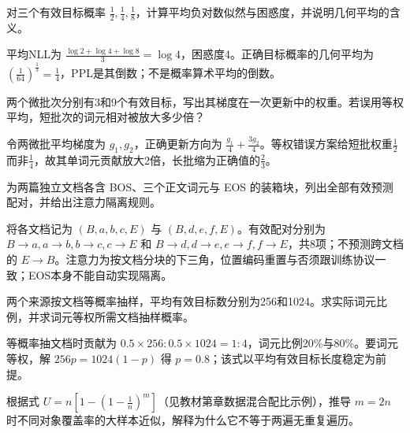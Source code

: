 
\begin{exercises}
\begin{exercise} 对三个有效目标概率 $\frac{1}{2},\frac{1}{4},\frac{1}{8}$，计算平均负对数似然与困惑度，并说明几何平均的含义。

\begin{solution}
平均NLL为 $\frac{\log2+\log4+\log8}{3}=\log4$，困惑度4。正确目标概率的几何平均为 $(\frac{1}{64})^{\frac{1}{3}}=\frac{1}{4}$，PPL是其倒数；不是概率算术平均的倒数。
\end{solution}
\end{exercise}

\begin{exercise} 两个微批次分别有3和9个有效目标，写出其梯度在一次更新中的权重。若误用等权平均，短批次的词元相对被放大多少倍？

\begin{solution}
令两微批平均梯度为 $g_1,g_2$，正确更新方向为 $\frac{g_1}{4}+\frac{3g_2}{4}$。等权错误方案给短批权重$\frac{1}{2}$而非$\frac{1}{4}$，故其单词元贡献放大2倍，长批缩为正确值的$\frac{2}{3}$。
\end{solution}
\end{exercise}

\begin{exercise} 为两篇独立文档各含 BOS、三个正文词元与 EOS 的装箱块，列出全部有效预测配对，并给出注意力隔离规则。

\begin{solution}
将各文档记为 $(B,a,b,c,E)$ 与 $(B,d,e,f,E)$。有效配对分别为 $B\to a,a\to b,b\to c,c\to E$ 和 $B\to d,d\to e,e\to f,f\to E$，共8项；不预测跨文档的 $E\to B$。注意力为按文档分块的下三角，位置编码重置与否须跟训练协议一致；EOS本身不能自动实现隔离。
\end{solution}
\end{exercise}

\begin{exercise} 两个来源按文档等概率抽样，平均有效目标数分别为256和1024。求实际词元比例，并求词元等权所需文档抽样概率。

\begin{solution}
等概率抽文档时贡献为 $0.5\times256:0.5\times1024=1:4$，词元比例20\%与80\%。要词元等权，解 $256p=1024(1-p)$ 得 $p=0.8$；该式以平均有效目标长度稳定为前提。
\end{solution}
\end{exercise}

\begin{exercise}\optional 根据式 $U=n[1-(1-\frac1n)^m]$（见教材第章数据混合配比示例），推导 $m=2n$ 时不同对象覆盖率的大样本近似，解释为什么它不等于两遍无重复遍历。


\end{exercise}
\end{exercises}

